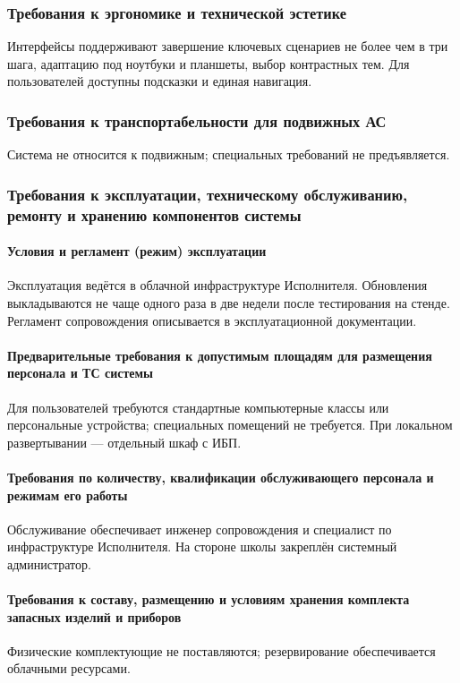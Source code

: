 \documentclass[14pt,a4paper]{extarticle}
\begin{document}
\subsubsection{Требования к эргономике и технической эстетике}
Интерфейсы поддерживают завершение ключевых сценариев не более чем в три шага, адаптацию под ноутбуки и планшеты, выбор контрастных тем. Для пользователей доступны подсказки и единая навигация.

\subsubsection{Требования к транспортабельности для подвижных АС}
Система не относится к подвижным; специальных требований не предъявляется.

\subsubsection{Требования к эксплуатации, техническому обслуживанию, ремонту и хранению компонентов системы}
\paragraph{Условия и регламент (режим) эксплуатации} Эксплуатация ведётся в облачной инфраструктуре Исполнителя. Обновления выкладываются не чаще одного раза в две недели после тестирования на стенде. Регламент сопровождения описывается в эксплуатационной документации.
\paragraph{Предварительные требования к допустимым площадям для размещения персонала и ТС системы} Для пользователей требуются стандартные компьютерные классы или персональные устройства; специальных помещений не требуется. При локальном развертывании — отдельный шкаф с ИБП.
\paragraph{Требования по количеству, квалификации обслуживающего персонала и режимам его работы} Обслуживание обеспечивает инженер сопровождения и специалист по инфраструктуре Исполнителя. На стороне школы закреплён системный администратор.
\paragraph{Требования к составу, размещению и условиям хранения комплекта запасных изделий и приборов} Физические комплектующие не поставляются; резервирование обеспечивается облачными ресурсами.
\end{document}

